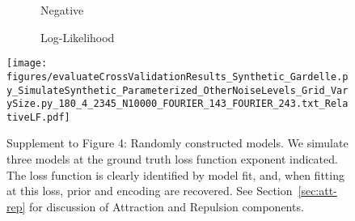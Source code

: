 \begin{figure}
\begin{minipage}[c]{0.8\linewidth}
\end{minipage}
\begin{minipage}[c]{0.19\linewidth}
\centering

\ \ \ \ \ \ Negative

\ \ \ \ \ \ Log-Likelihood


\texttt{[image: figures/evaluateCrossValidationResults\_Synthetic\_Gardelle.py\_SimulateSynthetic\_Parameterized\_OtherNoiseLevels\_Grid\_VarySize.py\_180\_4\_2345\_N10000\_FOURIER\_143\_FOURIER\_243.txt\_RelativeLF.pdf]}
\end{minipage}

\caption{Supplement to Figure 4: Randomly constructed models.
We simulate three models at the ground truth loss function exponent indicated.
The loss function is clearly identified by model fit, and, when fitting at this loss, prior and encoding are recovered.
See Section~\ref{sec:att-rep} for discussion of Attraction and Repulsion components.
}
\label{fig:fourier-4}
\end{figure}

